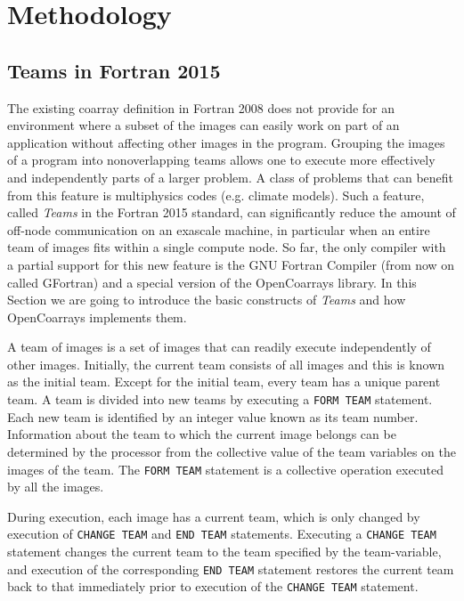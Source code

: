 \section{Methodology}\label{sec:methodology}
\subsection{Teams in Fortran 2015}\label{teams-in-fortran-2015}
The existing coarray definition in Fortran 2008 does not provide for an environment
where a subset of the images can easily work on part of an application without affecting
other images in the program.  Grouping the images of a program into nonoverlapping
teams allows one to execute more effectively and independently parts of a larger
problem.  A class of problems that can benefit from this feature is multiphysics codes
(e.g.  climate models).
Such a feature, called \textit{Teams} in the Fortran 2015 standard, can significantly reduce the amount of off-node
communication on an exascale machine, in particular when an entire team of images
fits within a single compute node.
So far, the only compiler with a partial support for this new feature is the GNU Fortran Compiler (from now on
called GFortran) and a special version of the OpenCoarrays library.
In this Section we are going to introduce the basic constructs of \textit{Teams} and how OpenCoarrays implements them.

A team of images is a set of images that can readily execute independently of other images.
Initially, the current team consists of all images and this is
known as the initial team. Except for the initial team, every team has a unique parent team. A team is divided
into new teams by executing a \texttt{FORM TEAM} statement.
Each new team is identified by an integer value known
as its team number. Information about the team to which the current image belongs can be determined by the
processor from the collective value of the team variables on the images of the team.
The \texttt{FORM TEAM} statement is a collective operation executed by all the images.

During execution, each image has a current team, which is only changed by execution of \texttt{CHANGE TEAM} and
\texttt{END TEAM} statements. Executing a \texttt{CHANGE TEAM} statement changes the current team to the team specified
by the team-variable, and execution of the corresponding \texttt{END TEAM} statement restores the current team back
to that immediately prior to execution of the \texttt{CHANGE TEAM} statement.

